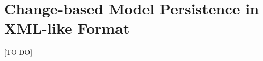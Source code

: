 \chapter{Change-based Model Persistence in XML-like Format}
\label{sec:examples_of_cbp}

\textsf{[TO DO]}

